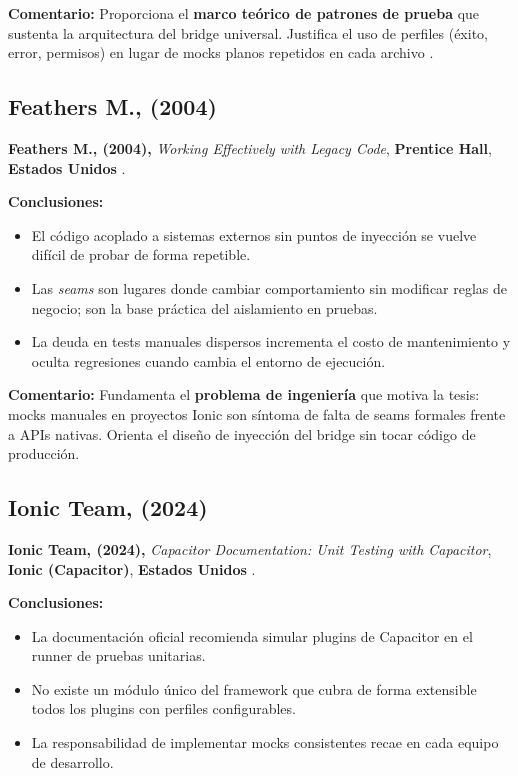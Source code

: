 \textbf{Comentario:} Proporciona el \textbf{marco teórico de patrones de prueba} que sustenta la arquitectura del bridge universal. Justifica el uso de perfiles (éxito, error, permisos) en lugar de mocks planos repetidos en cada archivo .

\subsection{Feathers M., (2004)}
\label{sec:antecedente_feathers}

\textbf{Feathers M., (2004),} \textit{Working Effectively with Legacy Code}, \textbf{Prentice Hall}, \textbf{Estados Unidos} \cite{feathers2004working}.

\textbf{Conclusiones:}
\begin{itemize}
    \item El código acoplado a sistemas externos sin puntos de inyección se vuelve difícil de probar de forma repetible.
    \item Las \textit{seams} son lugares donde cambiar comportamiento sin modificar reglas de negocio; son la base práctica del aislamiento en pruebas.
    \item La deuda en tests manuales dispersos incrementa el costo de mantenimiento y oculta regresiones cuando cambia el entorno de ejecución.
\end{itemize}

\textbf{Comentario:} Fundamenta el \textbf{problema de ingeniería} que motiva la tesis: mocks manuales en proyectos Ionic son síntoma de falta de seams formales frente a APIs nativas. Orienta el diseño de inyección del bridge sin tocar código de producción.

\subsection{Ionic Team, (2024)}
\label{sec:antecedente_capacitor}

\textbf{Ionic Team, (2024),} \textit{Capacitor Documentation: Unit Testing with Capacitor}, \textbf{Ionic (Capacitor)}, \textbf{Estados Unidos} \cite{capacitor2024testing}.

\textbf{Conclusiones:}
\begin{itemize}
    \item La documentación oficial recomienda simular plugins de Capacitor en el runner de pruebas unitarias.
    \item No existe un módulo único del framework que cubra de forma extensible todos los plugins con perfiles configurables.
    \item La responsabilidad de implementar mocks consistentes recae en cada equipo de desarrollo.
\end{itemize}

